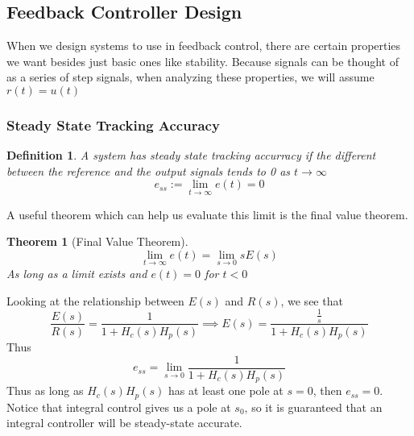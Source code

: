 \documentclass{article}
\newtheorem{theorem}{Theorem}
\newtheorem{definition}{Definition}
\begin{document}
\subsection{Feedback Controller Design}
When we design systems to use in feedback control, there are certain properties we want besides just basic ones like stability.
Because signals can be thought of as a series of step signals, when analyzing these properties,
we will assume $r(t)=u(t)$ 
\subsubsection{Steady State Tracking Accuracy}
\begin{figure}[H]
    \centering
    
\end{figure}
\begin{definition}
    A system has steady state tracking accurracy if the different between the reference and the output signals
    tends to 0 as $t\rightarrow \infty$
    $$e_{ss} := \lim_{t\rightarrow\infty}{e(t)}=0$$
\end{definition}
A useful theorem which can help us evaluate this limit is the final value theorem.
\begin{theorem}[Final Value Theorem]
    $$\lim_{t\rightarrow\infty}{e(t)} = \lim_{s\rightarrow0}{sE(s)}$$
    As long as a limit exists and $e(t)=0$ for $t<0$
\end{theorem}
Looking at the relationship between $E(s)$ and $R(s)$, we see that 
$$\frac{E(s)}{R(s)} = \frac{1}{1+H_c(s)H_p(s)} \implies E(s) = \frac{\frac{1}{s}}{1+H_c(s)H_p(s)}$$
Thus
$$e_{ss}=\lim_{s\rightarrow0}{\frac{1}{1+H_c(s)H_p(s)}}$$
Thus as long as $H_c(s)H_p(s)$ has at least one pole at $s=0$, then $e_{ss}=0$.
Notice that integral control gives us a pole at $s_0$, so it is guaranteed that an integral controller will be steady-state accurate.
\end{document}
